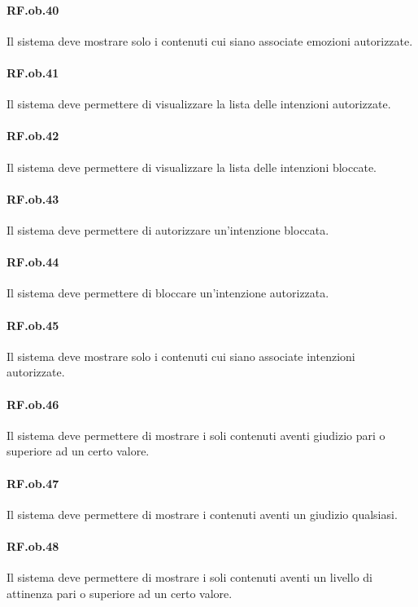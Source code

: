 \documentclass[10pt,a4paper,headinclude,footinclude,hidelinks]{scrreprt} %
\begin{document}
	\paragraph{RF.ob.40} Il sistema deve mostrare solo i contenuti cui siano associate emozioni autorizzate.

	\paragraph{RF.ob.41} Il sistema deve permettere di visualizzare la lista delle intenzioni autorizzate.

	\paragraph{RF.ob.42} Il sistema deve permettere di visualizzare la lista delle intenzioni bloccate.

	\paragraph{RF.ob.43} Il sistema deve permettere di autorizzare un'intenzione bloccata.

	\paragraph{RF.ob.44} Il sistema deve permettere di bloccare un'intenzione autorizzata.

	\paragraph{RF.ob.45} Il sistema deve mostrare solo i contenuti cui siano associate intenzioni autorizzate.

	\paragraph{RF.ob.46} Il sistema deve permettere di mostrare i soli contenuti aventi giudizio pari o superiore ad un certo valore.

	\paragraph{RF.ob.47} Il sistema deve permettere di mostrare i contenuti aventi un giudizio qualsiasi.

	\paragraph{RF.ob.48} Il sistema deve permettere di mostrare i soli contenuti aventi un livello di attinenza pari o superiore ad un certo valore.
\end{document}
